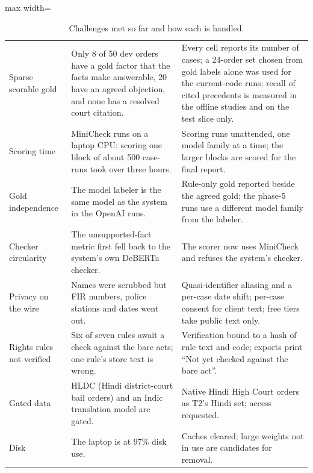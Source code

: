 \begin{table}[!t]
\begin{adjustbox}{max width=\textwidth}
\begin{tabular}{@{}p{4.6cm}p{5.4cm}p{5.2cm}@{}}
Sparse scorable gold & Only 8 of 50 dev orders have a gold factor that the facts make answerable, 20 have an agreed objection, and none has a resolved court citation. & Every cell reports its number of cases; a 24-order set chosen from gold labels alone was used for the current-code runs; recall of cited precedents is measured in the offline studies and on the test slice only. \\
Scoring time & MiniCheck runs on a laptop CPU: scoring one block of about 500 case-runs took over three hours. & Scoring runs unattended, one model family at a time; the larger blocks are scored for the final report. \\
Gold independence & The model labeler is the same model as the system in the OpenAI runs. & Rule-only gold reported beside the agreed gold; the phase-5 runs use a different model family from the labeler. \\
Checker circularity & The unsupported-fact metric first fell back to the system's own DeBERTa checker. & The scorer now uses MiniCheck and refuses the system's checker. \\
Privacy on the wire & Names were scrubbed but FIR numbers, police stations and dates went out. & Quasi-identifier aliasing and a per-case date shift; per-case consent for client text; free tiers take public text only. \\
Rights rules not verified & Six of seven rules await a check against the bare acts; one rule's store text is wrong. & Verification bound to a hash of rule text and code; exports print ``Not yet checked against the bare act''. \\
Gated data & HLDC (Hindi district-court bail orders) and an Indic translation model are gated. & Native Hindi High Court orders as T2's Hindi set; access requested. \\
Disk & The laptop is at 97\% disk use. & Caches cleared; large weights not in use are candidates for removal. \\
\bottomrule
\end{tabular}
\end{adjustbox}
\caption{Challenges met so far and how each is handled.}
\label{tab:challenges}
\end{table}

